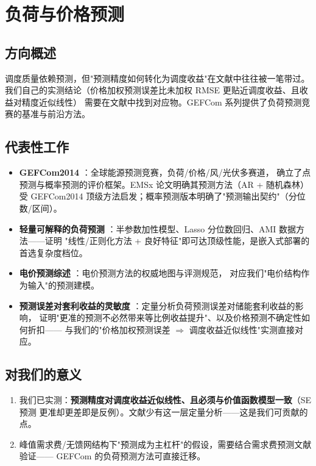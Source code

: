 \documentclass[10pt, twocolumn]{article}
\begin{document}
\section{负荷与价格预测}\label{sec:forecast}

\subsection{方向概述}
调度质量依赖预测，但"预测精度如何转化为调度收益"在文献中往往被一笔带过。
我们自己的实测结论（价格加权预测误差比未加权 RMSE 更贴近调度收益、且收益对精度近似线性）
需要在文献中找到对应物。GEFCom 系列提供了负荷预测竞赛的基准与前沿方法。

\subsection{代表性工作}
\begin{itemize}
\item \textbf{GEFCom2014} \cite{gefcom2014, hong_gefcom_prob}：全球能源预测竞赛，负荷/价格/风/光伏多赛道，
确立了点预测与概率预测的评价框架。EMSx 论文明确其预测方法（AR + 随机森林）受 GEFCom2014
顶级方法启发；概率预测版本明确了"预测输出契约"（分位数/区间）。
\item \textbf{轻量可解释的负荷预测} \cite{fan_hyndman_stlf, ziel_lasso_gefcom,
mansoor_stlf_ami}：半参数加性模型、Lasso 分位数回归、AMI 数据方法——证明
"线性/正则化方法 + 良好特征"即可达顶级性能，是嵌入式部署的首选复杂度档位。
\item \textbf{电价预测综述} \cite{weron_price_forecast}：电价预测方法的权威地图与评测规范，
对应我们"电价结构作为输入"的预测建模。
\item \textbf{预测误差对套利收益的灵敏度} \cite{kiedanski_forecast_error,
bhattacharjee_uncertainty_arbitrage}：定量分析负荷预测误差对储能套利收益的影响，
证明"更准的预测不必然带来等比例收益提升"、以及价格预测不确定性如何折扣——
与我们的"价格加权预测误差 $\Rightarrow$ 调度收益近似线性"实测直接对应。
\end{itemize}

\subsection{对我们的意义}
\begin{enumerate}
\item 我们已实测：\textbf{预测精度对调度收益近似线性、且必须与价值函数模型一致}（SE 预测
更准却更差即是反例）。文献少有这一层定量分析——这是我们可贡献的点。
\item 峰值需求费/无馈网结构下"预测成为主杠杆"的假设，需要结合需求费预测文献验证——
GEFCom 的负荷预测方法可直接迁移。
\end{enumerate}
\end{document}

